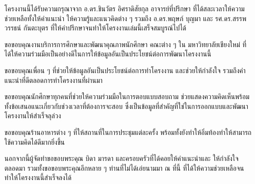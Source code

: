\iffalse
\begin{dedication}
This document is dedicated to all Chiang Mai University students.

Dedication page is optional.
\end{dedication}
\fi %

\begin{acknowledgments}
โครงงานนี้ได้รับความกรุณาจาก อ.ดร.ชินวัตร อิศราดิสัยกุล อาจารย์ที่ปรึกษา ที่ได้สละเวลาให้ความช่วยเหลือทั้งให้คำแนะนำ ให้ความรู้และแนวคิดต่าง ๆ รวมถึง อ.ดร.พฤษภ์ บุญมา และ รศ.ดร.สรรพวรรธน์ กันตะบุตร ที่ให้คำปรึกษาจนทำให้โครงงานเล่มนี้เสร็จสมบูรณ์ไปได้
    
ขอขอบคุณงานบริการการศึกษาและพัฒนาคุณภาพนักศึกษา คณะต่าง ๆ ใน มหาวิทยาลัยเชียงใหม่ ที่ได้ให้ความร่วมมือเป็นอย่างดีในการให้ข้อมูลอันเป็นประโยชน์ต่อการพัฒนาโครงงานนี้

ขอขอบคุณเพื่อน ๆ ที่ช่วยให้ข้อมูลอันเป็นประโยชน์ต่อการทำโครงงาน และช่วยให้กำลังใจ รวมถึงคำแนะนำที่ดีตลอดการทำโครงงานที่ผ่านมา

ขอขอบคุณนักศึกษาทุกคนที่ช่วยให้ความร่วมมือในการตอบแบบสอบถาม ช่วยแสดงความคิดเห็นพร้อมทั้งข้อเสนอแนะเกี่ยวกับช่วงเวลาที่ต้องการจะสอบ ซึ่งเป็นข้อมูลที่สำคัญที่ใช่ในการออกแบบและพัฒนาโครงงานให้สำเร็จลุล่วง

ขอขอบคุณร้านอาหารต่าง ๆ ที่ให้สถานที่ในการประชุมแต่ละครั้ง พร้อมทั้งยังทำให้อิ่มท้องทำให้สามารถใช้ความคิดได้ดีมากยิ่งขึ้น

นอกจากนี้ผู้จัดทำขอขอบพระคุณ บิดา มารดา และครอบครัวที่ได้คอยให้คำแนะนำและ ให้กำลังใจ ตลอดมา รวมทั้งขอขอบพระคุณอีกหลาย ๆ ท่านที่ไม่ได้เอ่ยนามมา ณ ที่นี้ ที่ได้ให้ความช่วยเหลือจนทำให้โครงงานนี้สำเร็จลงได้ 


\end{acknowledgments}%
\fi %

\contentspage

\ifproject
\figurelistpage

\tablelistpage
\fi %



